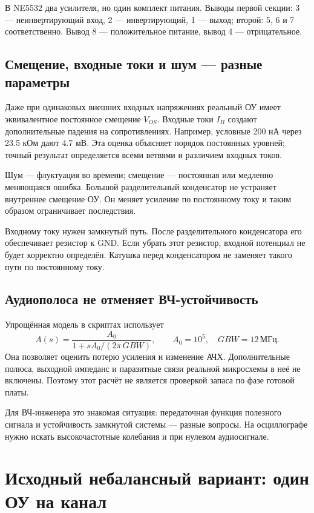 \documentclass[a4paper,11pt]{article}
\begin{document}
В NE5532 два усилителя, но один комплект питания. Выводы первой секции:
3 — неинвертирующий вход, 2 — инвертирующий, 1 — выход;
второй: 5, 6 и 7 соответственно. Вывод 8 — положительное питание,
вывод 4 — отрицательное\cite{ti-ne5532}.

\subsection{Смещение, входные токи и шум — разные параметры}

Даже при одинаковых внешних входных напряжениях реальный ОУ имеет эквивалентное
постоянное смещение $V_{OS}$. Входные токи $I_B$ создают дополнительные падения
на сопротивлениях. Например, условные 200 нА через 23.5 кОм дают 4.7 мВ.
Эта оценка объясняет порядок постоянных уровней; точный результат определяется
всеми ветвями и различием входных токов.

Шум — флуктуация во времени; смещение — постоянная или медленно меняющаяся ошибка.
Большой разделительный конденсатор не устраняет внутреннее смещение ОУ.
Он меняет усиление по постоянному току и таким образом ограничивает последствия.

Входному току нужен замкнутый путь. После разделительного конденсатора его
обеспечивает резистор к GND. Если убрать этот резистор, входной потенциал
не будет корректно определён\cite{adi-bias}. Катушка перед конденсатором
не заменяет такого пути по постоянному току.

\subsection{Аудиополоса не отменяет ВЧ-устойчивость}

Упрощённая модель в скриптах использует
\[
 A(s)=\frac{A_0}{1+sA_0/(2\pi\,GBW)},\qquad
 A_0=10^5,\quad GBW=12\,\text{МГц}.
\]
Она позволяет оценить потерю усиления и изменение АЧХ. Дополнительные полюса,
выходной импеданс и паразитные связи реальной микросхемы в неё не включены.
Поэтому этот расчёт не является проверкой запаса по фазе готовой платы.

Для ВЧ-инженера это знакомая ситуация: передаточная функция полезного сигнала
и устойчивость замкнутой системы — разные вопросы. На осциллографе нужно искать
высокочастотные колебания и при нулевом аудиосигнале.

\section{Исходный небалансный вариант: один ОУ на канал}
\end{document}
